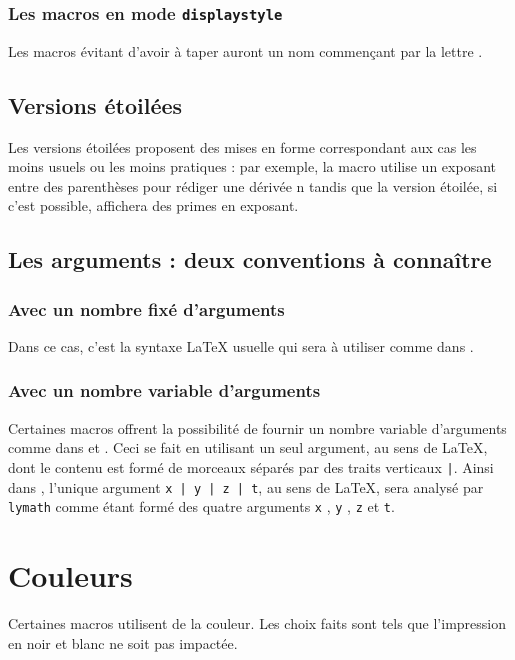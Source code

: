 \documentclass[12pt,a4paper]{article}
\begin{document}
\subsubsection{Les macros en mode \texttt{displaystyle}}

Les macros évitant d'avoir à taper  auront un nom commençant par la lettre .




\subsection{Versions étoilées}

Les versions étoilées proposent des mises en forme correspondant aux cas les moins usuels ou les moins pratiques : par exemple, la macro  utilise un exposant entre des parenthèses pour rédiger une dérivée n\ieme{} tandis que la version étoilée, si c'est possible, affichera des primes en exposant.




\subsection{Les arguments : deux conventions à connaître}

\subsubsection{Avec un nombre fixé d'arguments}

Dans ce cas, c'est la syntaxe \LaTeX{} usuelle qui sera à utiliser comme dans .




\subsubsection{Avec un nombre variable d'arguments}

Certaines macros offrent la possibilité de fournir un nombre variable d'arguments comme dans  et .
Ceci se fait en utilisant un seul argument, au sens de \LaTeX{}, dont le contenu est formé de morceaux séparés par des traits verticaux \verb+|+.
Ainsi dans , l'unique argument \verb+x | y | z | t+, au sens de \LaTeX{}, sera analysé par \verb+lymath+ comme étant formé des quatre arguments \verb+x+ , \verb+y+ , \verb+z+ et \verb+t+.




\section{Couleurs}

Certaines macros utilisent de la couleur. Les choix faits sont tels que l'impression en noir et blanc ne soit pas impactée.
\end{document}
